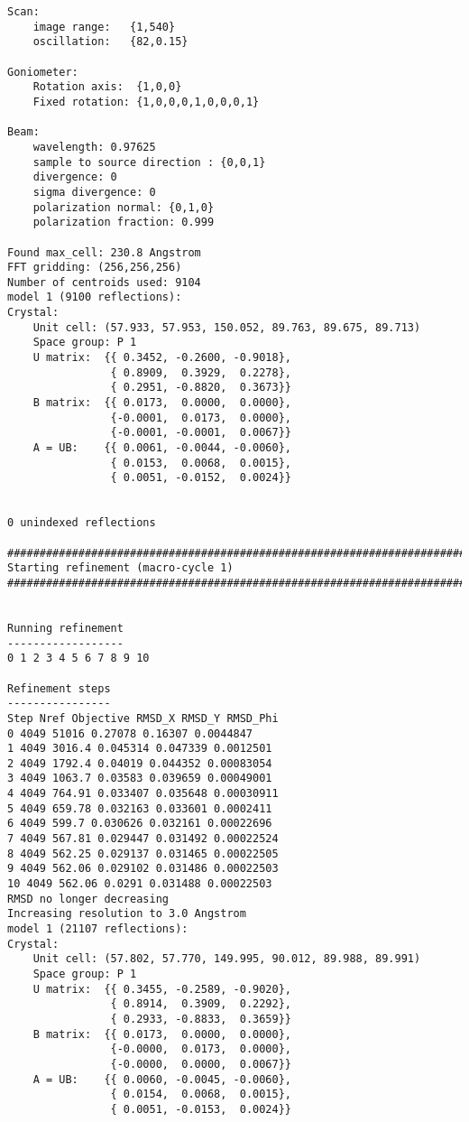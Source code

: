 \documentclass[a4paper, 11pt]{article}
\begin{document}
{\begin{verbatim}
Scan:
    image range:   {1,540}
    oscillation:   {82,0.15}

Goniometer:
    Rotation axis:  {1,0,0}
    Fixed rotation: {1,0,0,0,1,0,0,0,1}

Beam:
    wavelength: 0.97625
    sample to source direction : {0,0,1}
    divergence: 0
    sigma divergence: 0
    polarization normal: {0,1,0}
    polarization fraction: 0.999

Found max_cell: 230.8 Angstrom
FFT gridding: (256,256,256)
Number of centroids used: 9104
model 1 (9100 reflections):
Crystal:
    Unit cell: (57.933, 57.953, 150.052, 89.763, 89.675, 89.713)
    Space group: P 1
    U matrix:  {{ 0.3452, -0.2600, -0.9018},
                { 0.8909,  0.3929,  0.2278},
                { 0.2951, -0.8820,  0.3673}}
    B matrix:  {{ 0.0173,  0.0000,  0.0000},
                {-0.0001,  0.0173,  0.0000},
                {-0.0001, -0.0001,  0.0067}}
    A = UB:    {{ 0.0061, -0.0044, -0.0060},
                { 0.0153,  0.0068,  0.0015},
                { 0.0051, -0.0152,  0.0024}}


0 unindexed reflections

################################################################################
Starting refinement (macro-cycle 1)
################################################################################


Running refinement
------------------
0 1 2 3 4 5 6 7 8 9 10

Refinement steps
----------------
Step Nref Objective RMSD_X RMSD_Y RMSD_Phi
0 4049 51016 0.27078 0.16307 0.0044847 
1 4049 3016.4 0.045314 0.047339 0.0012501 
2 4049 1792.4 0.04019 0.044352 0.00083054 
3 4049 1063.7 0.03583 0.039659 0.00049001 
4 4049 764.91 0.033407 0.035648 0.00030911 
5 4049 659.78 0.032163 0.033601 0.0002411 
6 4049 599.7 0.030626 0.032161 0.00022696 
7 4049 567.81 0.029447 0.031492 0.00022524 
8 4049 562.25 0.029137 0.031465 0.00022505 
9 4049 562.06 0.029102 0.031486 0.00022503 
10 4049 562.06 0.0291 0.031488 0.00022503 
RMSD no longer decreasing
Increasing resolution to 3.0 Angstrom
model 1 (21107 reflections):
Crystal:
    Unit cell: (57.802, 57.770, 149.995, 90.012, 89.988, 89.991)
    Space group: P 1
    U matrix:  {{ 0.3455, -0.2589, -0.9020},
                { 0.8914,  0.3909,  0.2292},
                { 0.2933, -0.8833,  0.3659}}
    B matrix:  {{ 0.0173,  0.0000,  0.0000},
                {-0.0000,  0.0173,  0.0000},
                {-0.0000,  0.0000,  0.0067}}
    A = UB:    {{ 0.0060, -0.0045, -0.0060},
                { 0.0154,  0.0068,  0.0015},
                { 0.0051, -0.0153,  0.0024}}



\end{verbatim}}
\end{document}
